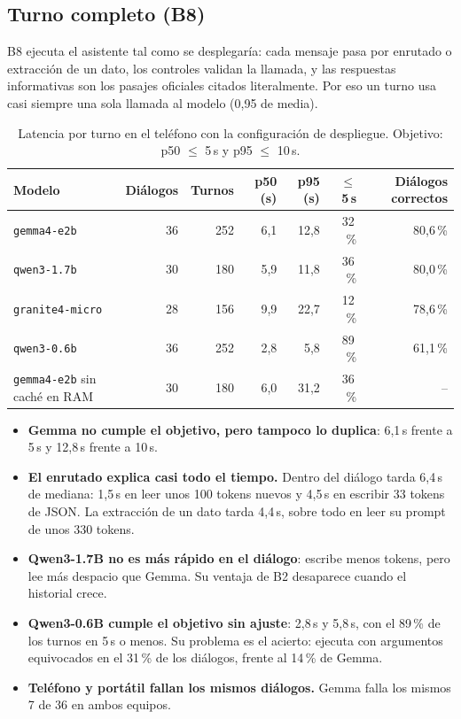\documentclass[11pt,a4paper]{article}
\newcommand{\m}[1]{\texttt{#1}}
\newcommand{\nd}{\textcolor{muted}{--}}
\begin{document}
\subsection{Turno completo (B8)}\label{sec:turn}

B8 ejecuta el asistente tal como se desplegaría: cada mensaje pasa por enrutado o extracción de un dato, los controles validan la llamada, y las respuestas informativas son los pasajes oficiales citados literalmente. Por eso un turno usa casi siempre una sola llamada al modelo (0,95 de media).

\begin{table}[H]
\centering\small
\caption{Latencia por turno en el teléfono con la configuración de despliegue. Objetivo: p50 $\le$ 5\,s y p95 $\le$ 10\,s.}\label{tab:turn}
\begin{tabularx}{\textwidth}{@{}lrrRRRR@{}}
\toprule
Modelo & Diálogos & Turnos & p50 (s) & p95 (s) & $\le$ 5\,s & Diálogos correctos\\
\midrule
\m{gemma4-e2b} & 36 & 252 & 6,1 & 12,8 & 32\,\% & 80,6\,\%\\
\m{qwen3-1.7b} & 30 & 180 & 5,9 & 11,8 & 36\,\% & 80,0\,\%\\
\m{granite4-micro} & 28 & 156 & 9,9 & 22,7 & 12\,\% & 78,6\,\%\\
\m{qwen3-0.6b} & 36 & 252 & 2,8 & 5,8 & 89\,\% & 61,1\,\%\\
\midrule
\m{gemma4-e2b} sin caché en RAM & 30 & 180 & 6,0 & 31,2 & 36\,\% & \nd\\
\bottomrule
\end{tabularx}
\end{table}

\begin{itemize}
\item \textbf{Gemma no cumple el objetivo, pero tampoco lo duplica}: 6,1\,s frente a 5\,s y 12,8\,s frente a 10\,s.
\item \textbf{El enrutado explica casi todo el tiempo.} Dentro del diálogo tarda 6,4\,s de mediana: 1,5\,s en leer unos 100 tokens nuevos y 4,5\,s en escribir 33 tokens de JSON. La extracción de un dato tarda 4,4\,s, sobre todo en leer su prompt de unos 330 tokens.
\item \textbf{Qwen3-1.7B no es más rápido en el diálogo}: escribe menos tokens, pero lee más despacio que Gemma. Su ventaja de B2 desaparece cuando el historial crece.
\item \textbf{Qwen3-0.6B cumple el objetivo sin ajuste}: 2,8\,s y 5,8\,s, con el 89\,\% de los turnos en 5\,s o menos. Su problema es el acierto: ejecuta con argumentos equivocados en el 31\,\% de los diálogos, frente al 14\,\% de Gemma.
\item \textbf{Teléfono y portátil fallan los mismos diálogos.} Gemma falla los mismos 7 de 36 en ambos equipos.
\end{itemize}
\end{document}
